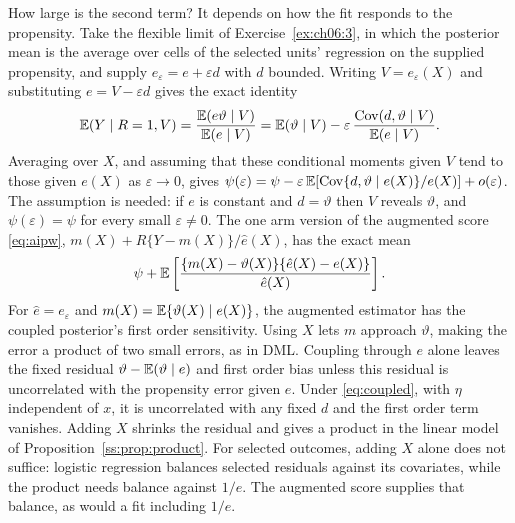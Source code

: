 How large is the second term? It depends on how the fit responds to the propensity. Take the flexible limit of Exercise~\ref{ex:ch06:3}, in which the posterior mean is the average over cells of the selected units' regression on the supplied propensity, and supply $e_\varepsilon = e + \varepsilon d$ with $d$ bounded. Writing $V = e_\varepsilon(X)$ and substituting $e = V - \varepsilon d$ gives the exact identity
\[
\mathbb{E}(Y \mid R = 1, V) = \frac{\mathbb{E}(e\vartheta \mid V)}{\mathbb{E}(e \mid V)} = \mathbb{E}(\vartheta \mid V) - \varepsilon\,\frac{\mathrm{Cov}(d, \vartheta \mid V)}{\mathbb{E}(e \mid V)}.
\]
Averaging over $X$, and assuming that these conditional moments given $V$ tend to those given $e(X)$ as $\varepsilon \to 0$, gives $\psi(\varepsilon) = \psi - \varepsilon\,\mathbb{E}[\mathrm{Cov}\{d, \vartheta \mid e(X)\}/e(X)] + o(\varepsilon)$. The assumption is needed: if $e$ is constant and $d = \vartheta$ then $V$ reveals $\vartheta$, and $\psi(\varepsilon) = \psi$ for every small $\varepsilon \ne 0$. The one arm version of the augmented score \eqref{eq:aipw}, $m(X) + R\{Y - m(X)\}/\hat e(X)$, has the exact mean
\[
\psi + \mathbb{E}\left[\frac{\{m(X) - \vartheta(X)\}\{\hat e(X) - e(X)\}}{\hat e(X)}\right].
\]
For $\hat e=e_\varepsilon$ and $m(X)=\mathbb{E}\{\vartheta(X)\mid e(X)\}$, the augmented estimator has the coupled posterior's first order sensitivity. Using $X$ lets $m$ approach $\vartheta$, making the error a product of two small errors, as in DML. Coupling through $e$ alone leaves the fixed residual $\vartheta-\mathbb{E}(\vartheta\mid e)$ and first order bias unless this residual is uncorrelated with the propensity error given $e$. Under \eqref{eq:coupled}, with $\eta$ independent of $x$, it is uncorrelated with any fixed $d$ and the first order term vanishes. Adding $X$ shrinks the residual and gives a product in the linear model of Proposition~\ref{ss:prop:product}. For selected outcomes, adding $X$ alone does not suffice: logistic regression balances selected residuals against its covariates, while the product needs balance against $1/e$. The augmented score supplies that balance, as would a fit including $1/e$.


